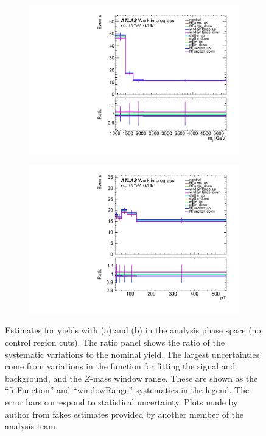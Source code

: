 \begin{figure}[t]
\centering
\begin{subfigure}[b]{0.48\textwidth}
    \centering
    \includegraphics[width=\textwidth]{plots/diffx/ratio_mjj_efakey.pdf}
    \caption{}
\end{subfigure}
\hfill
\begin{subfigure}[b]{0.48\textwidth}
    \centering
    \includegraphics[width=\textwidth]{plots/diffx/ratio_lep_pt_efakey.pdf}
    \caption{}
\end{subfigure}
\caption{Estimates for \efakey yields with \mjj (a) and \leppt (b) in the analysis phase space (no control region cuts). The ratio panel shows the ratio of the systematic variations to the nominal yield. The largest uncertainties come from variations in the function for fitting the signal and background, and the $Z$-mass window range. These are shown as the ``fitFunction'' and ``windowRange'' systematics in the legend. The error bars correspond to statistical uncertainty. Plots made by author from fakes estimates provided by another member of the analysis team.\label{fig:vbswy:efakey}}
\end{figure}

